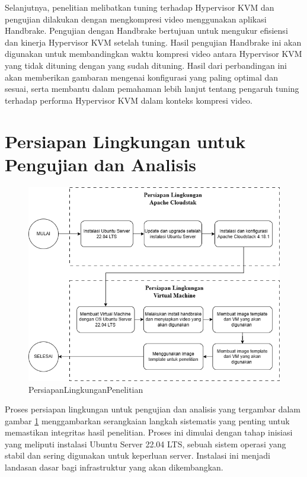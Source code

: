 Selanjutnya, penelitian melibatkan tuning terhadap Hypervisor KVM dan pengujian dilakukan dengan mengkompresi video menggunakan aplikasi Handbrake. Pengujian dengan Handbrake bertujuan untuk mengukur efisiensi dan kinerja Hypervisor KVM setelah tuning. Hasil pengujian Handbrake ini akan digunakan untuk membandingkan waktu kompresi video antara Hypervisor KVM yang tidak dituning dengan yang sudah dituning. Hasil dari perbandingan ini akan memberikan gambaran mengenai konfigurasi yang paling optimal dan sesuai, serta membantu dalam pemahaman lebih lanjut tentang pengaruh tuning terhadap performa Hypervisor KVM dalam konteks kompresi video.

\section{Persiapan Lingkungan untuk Pengujian dan Analisis}
\begin{figure}
	\centering
	\includegraphics[width=1\textwidth]
	{assets/pics/persiapan_lingkungan_penelitian.png}
	\caption{PersiapanLingkunganPenelitian}
	\label{fig:PersiapanLingkunganPenelitian}
\end{figure}


Proses persiapan lingkungan untuk pengujian dan analisis yang tergambar dalam gambar \ref{fig:PersiapanLingkunganPenelitian} menggambarkan serangkaian langkah sistematis yang penting untuk memastikan integritas hasil penelitian. Proses ini dimulai dengan tahap inisiasi yang meliputi instalasi Ubuntu Server 22.04 LTS, sebuah sistem operasi yang stabil dan sering digunakan untuk keperluan server. Instalasi ini menjadi landasan dasar bagi infrastruktur yang akan dikembangkan.

